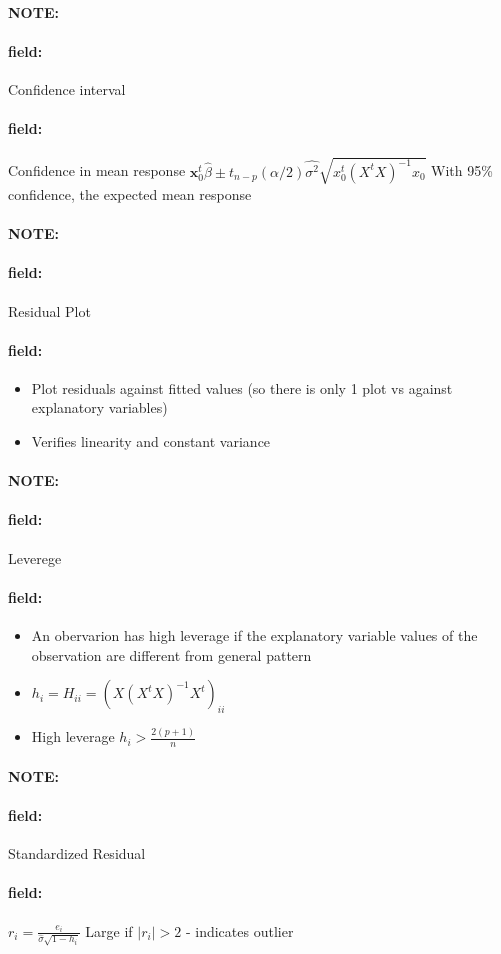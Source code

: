 \documentclass[12pt]{article}
\newenvironment{note}{\paragraph{NOTE:}}{}
\newenvironment{field}{\paragraph{field:}}{}
\begin{document}
\begin{note}
  \begin{field}
    Confidence interval
  \end{field}
  \begin{field}
    Confidence in mean response $\mathbf{x}_0^t \hat{\beta} \pm t_{n-p}(\alpha/2)\hat{\sigma^2} \sqrt{x_0^t(X^tX)^{-1}x_0}$
    With 95\% confidence, the expected mean response
  \end{field}
\end{note}


\begin{note}
  \begin{field}
    Residual Plot
  \end{field}
  \begin{field}
    \begin{itemize}
      \item Plot residuals against fitted values (so there is only 1 plot vs against explanatory variables)
      \item Verifies linearity and constant variance
    \end{itemize}
  \end{field}
\end{note}

\begin{note}
  \begin{field}
    Leverege
  \end{field}
  \begin{field}
    \begin{itemize}
      \item An obervarion has high leverage if the explanatory variable values of the observation are different from general pattern
      \item $h_i = H_{ii} = (X(X^tX)^{-1}X^t)_{ii}$
      \item High leverage $h_i > \frac{2(p+1)}{n}$
    \end{itemize}
  \end{field}
\end{note}

\begin{note}
  \begin{field}
    Standardized Residual
  \end{field}
  \begin{field}
    $r_i = \frac{e_i}{\hat{\sigma}\sqrt{1 - h_i}}$
    Large if $|r_i| > 2$ - indicates outlier
  \end{field}
\end{note}
\end{document}
